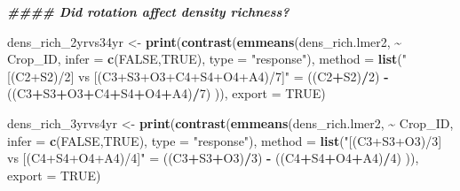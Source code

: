 \documentclass[
]{article}
\newenvironment{Shaded}{\begin{snugshade}}{\end{snugshade}}
\newcommand{\AttributeTok}[1]{\textcolor[rgb]{0.13,0.29,0.53}{#1}}
\newcommand{\ConstantTok}[1]{\textcolor[rgb]{0.56,0.35,0.01}{#1}}
\newcommand{\DecValTok}[1]{\textcolor[rgb]{0.00,0.00,0.81}{#1}}
\newcommand{\DocumentationTok}[1]{\textcolor[rgb]{0.56,0.35,0.01}{\textbf{\textit{#1}}}}
\newcommand{\FunctionTok}[1]{\textcolor[rgb]{0.13,0.29,0.53}{\textbf{#1}}}
\newcommand{\NormalTok}[1]{#1}
\newcommand{\OtherTok}[1]{\textcolor[rgb]{0.56,0.35,0.01}{#1}}
\newcommand{\SpecialCharTok}[1]{\textcolor[rgb]{0.81,0.36,0.00}{\textbf{#1}}}
\newcommand{\StringTok}[1]{\textcolor[rgb]{0.31,0.60,0.02}{#1}}
\begin{document}
\begin{Shaded}
\begin{Highlighting}[]
\DocumentationTok{\#\#\#\# Did rotation affect density richness?}

\NormalTok{dens\_rich\_2yrvs34yr }\OtherTok{\textless{}{-}} \FunctionTok{print}\NormalTok{(}\FunctionTok{contrast}\NormalTok{(}\FunctionTok{emmeans}\NormalTok{(dens\_rich.lmer2, }\SpecialCharTok{\textasciitilde{}}\NormalTok{ Crop\_ID,}
                                              \AttributeTok{infer =} \FunctionTok{c}\NormalTok{(}\ConstantTok{FALSE}\NormalTok{,}\ConstantTok{TRUE}\NormalTok{),}
                                              \AttributeTok{type =} \StringTok{"response"}\NormalTok{),}
                                      \AttributeTok{method =} \FunctionTok{list}\NormalTok{(}\StringTok{"[(C2+S2)/2] vs [(C3+S3+O3+C4+S4+O4+A4)/7]"} \OtherTok{=}
\NormalTok{                                                      ((C2}\SpecialCharTok{+}\NormalTok{S2)}\SpecialCharTok{/}\DecValTok{2}\NormalTok{) }\SpecialCharTok{{-}}\NormalTok{ ((C3}\SpecialCharTok{+}\NormalTok{S3}\SpecialCharTok{+}\NormalTok{O3}\SpecialCharTok{+}\NormalTok{C4}\SpecialCharTok{+}\NormalTok{S4}\SpecialCharTok{+}\NormalTok{O4}\SpecialCharTok{+}\NormalTok{A4)}\SpecialCharTok{/}\DecValTok{7}\NormalTok{) )),}
                             \AttributeTok{export =} \ConstantTok{TRUE}\NormalTok{)}


\NormalTok{dens\_rich\_3yrvs4yr }\OtherTok{\textless{}{-}} \FunctionTok{print}\NormalTok{(}\FunctionTok{contrast}\NormalTok{(}\FunctionTok{emmeans}\NormalTok{(dens\_rich.lmer2, }\SpecialCharTok{\textasciitilde{}}\NormalTok{ Crop\_ID, }\AttributeTok{infer =} \FunctionTok{c}\NormalTok{(}\ConstantTok{FALSE}\NormalTok{,}\ConstantTok{TRUE}\NormalTok{),}
                                            \AttributeTok{type =} \StringTok{"response"}\NormalTok{),}
                                    \AttributeTok{method =} \FunctionTok{list}\NormalTok{(}\StringTok{"[(C3+S3+O3)/3] vs [(C4+S4+O4+A4)/4]"} \OtherTok{=}
\NormalTok{                                                    ((C3}\SpecialCharTok{+}\NormalTok{S3}\SpecialCharTok{+}\NormalTok{O3)}\SpecialCharTok{/}\DecValTok{3}\NormalTok{) }\SpecialCharTok{{-}}\NormalTok{ ((C4}\SpecialCharTok{+}\NormalTok{S4}\SpecialCharTok{+}\NormalTok{O4}\SpecialCharTok{+}\NormalTok{A4)}\SpecialCharTok{/}\DecValTok{4}\NormalTok{) )),}
                           \AttributeTok{export =} \ConstantTok{TRUE}\NormalTok{)}


\end{Highlighting}
\end{Shaded}
\end{document}
